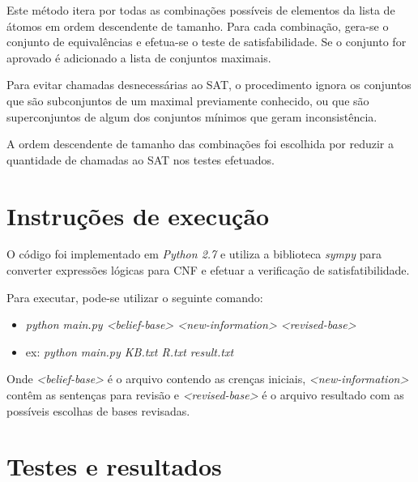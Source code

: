 \documentclass[10pt,a4paper]{amsart}
\begin{document}
Este método itera por todas as combinações possíveis de elementos da lista de átomos em ordem descendente de tamanho. Para cada combinação, gera-se o conjunto de equivalências e efetua-se o teste de satisfabilidade. Se o conjunto for aprovado é adicionado a lista de conjuntos maximais.

Para evitar chamadas desnecessárias ao SAT, o procedimento ignora os conjuntos que são subconjuntos de um maximal previamente conhecido, ou que são superconjuntos de algum dos conjuntos mínimos que geram inconsistência.

A ordem descendente de tamanho das combinações foi escolhida por reduzir a quantidade de chamadas ao SAT nos testes efetuados.

\section{Instruções de execução}
O código foi implementado em \emph{Python 2.7} e utiliza a biblioteca \emph{sympy} para converter expressões lógicas para CNF e efetuar a verificação de satisfatibilidade.

Para executar, pode-se utilizar o seguinte comando:
\begin{itemize}
 \item[] \emph{python main.py <belief-base> <new-information> <revised-base>}
 \item[] ex: \emph{python main.py KB.txt R.txt result.txt}
\end{itemize}

Onde \emph{<belief-base>} é o arquivo contendo as crenças iniciais, \emph{<new-information>} contêm as sentenças para revisão e \emph{<revised-base>} é o arquivo resultado com as possíveis escolhas de bases revisadas.

\section{Testes e resultados}





\end{document}
